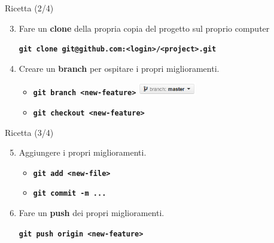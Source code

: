 \documentclass{beamer}
\begin{document}
\begin{frame}{\centerline{Ricetta (2/4)}}
  \begin{enumerate}
  \setcounter{enumi}{2}
  \item Fare un \textbf{clone} della propria copia del progetto sul proprio computer
    \begin{center}
        \texttt{\textbf{git clone git@github.com:<login>/<project>.git}}
    \end{center}
  \item Creare un \textbf{branch} per ospitare i propri miglioramenti.
    \begin{itemize}
    \item \texttt{\textbf{git branch <new-feature>}} \includegraphics[height=0.55cm]{A2023.LavoroCondiviso/github-branch}
    \item \texttt{\textbf{git checkout <new-feature>}}
    \end{itemize}
  \end{enumerate}
\end{frame}

\begin{frame}{\centerline{Ricetta (3/4)}}
  \begin{enumerate}
    \setcounter{enumi}{4}
  \item Aggiungere i propri miglioramenti.
    \begin{itemize}
    \item \texttt{\textbf{git add <new-file>}}
    \item \texttt{\textbf{git commit -m ...}}
    \end{itemize}    
  \item Fare un \textbf{push} dei propri miglioramenti.
    \begin{center}
      \texttt{\textbf{git push origin <new-feature>}}
    \end{center}
  \end{enumerate}
\end{frame}
\end{document}
